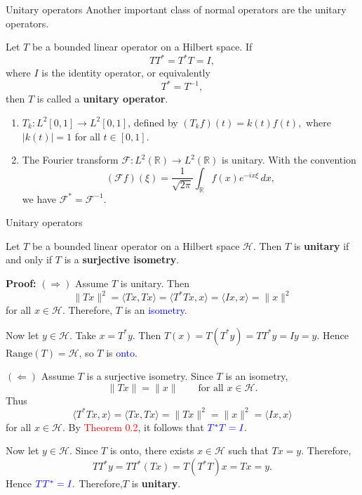 \documentclass[9pt, aspectratio=169]{beamer}
\begin{document}
\begin{frame}{ Unitary operators}
Another important class of normal operators are the unitary operators.
\begin{definition}
    Let $T$ be a bounded linear operator on a Hilbert space. If
    \[
    TT^* = T^*T = I,
    \]
    where $I$ is the identity operator, or equivalently
    \[
    T^* = T^{-1},
    \]
    then $T$ is called a \textbf{unitary operator}.
\end{definition}
\pause
\begin{examples}
    \begin{enumerate}
        \item $T_k:L^2[0,1]\to L^2[0,1]$, defined by
        $
        (T_kf)(t)=k(t)f(t),
        $
        where $|k(t)|=1$ for all $t\in[0,1]$.
\pause
        \item The Fourier transform $\mathcal{F}:L^2(\mathbb{R})\to L^2(\mathbb{R})$ is unitary. 
With the convention
\[
(\mathcal{F}f)(\xi)=\frac{1}{\sqrt{2\pi}}\int_{\mathbb{R}} f(x)e^{-ix\xi}\,dx,
\]
we have
$
\mathcal{F}^*=\mathcal{F}^{-1}.
$
    \end{enumerate}
\end{examples}
\end{frame}
 \begin{frame}{Unitary operators}
 \begin{tcolorbox}[colback=blue!5, colframe=blue!60!black, title=Theorem 5]
Let $T$ be a bounded linear operator on a Hilbert space $\mathcal{H}$. Then $T$ is \textbf{unitary} if and only if $T$ is a \textbf{surjective isometry}.
\end{tcolorbox}
\pause
{\fontsize{9pt}{4pt}\selectfont \textbf{Proof:}  $(\Rightarrow)$ Assume $T$ is unitary. Then
\[
\|Tx\|^2=\langle Tx,Tx\rangle=\langle T^*Tx,x\rangle=\langle Ix,x\rangle=\|x\|^2
\]
for all $x\in\mathcal{H}$. Therefore, $T$ is an \textcolor{blue}{isometry.}

Now let $y\in\mathcal{H}$. Take $x=T^*y$. Then
$
T(x)=T(T^*y)=TT^*y=Iy=y.
$
Hence $\mathrm{Range}(T)=\mathcal{H}$, so $T$ is \textcolor{blue}{onto.}

\pause

$(\Leftarrow)$ Assume $T$ is a surjective isometry. Since $T$ is an isometry,
\[
\|Tx\|=\|x\| \qquad \text{for all } x\in\mathcal{H}.
\]
Thus
\[
\langle T^*Tx,x\rangle=\langle Tx,Tx\rangle=\|Tx\|^2=\|x\|^2=\langle Ix,x\rangle
\]
for all $x\in\mathcal{H}$. 
By \textcolor{red}{Theorem 0.2}, it follows that
$
\textcolor{blue}{T^*T=I}.
$

Now let $y\in\mathcal{H}$. Since $T$ is onto, there exists $x\in\mathcal{H}$ such that $Tx=y$. Therefore,
\[
TT^*y=TT^*(Tx)=T(T^*T)x=Tx=y.
\]
Hence
$
\textcolor{blue}
{TT^*=I.}
$
Therefore,$T$ is \textbf{unitary}.}  \square
   
 \end{frame}
\end{document}
